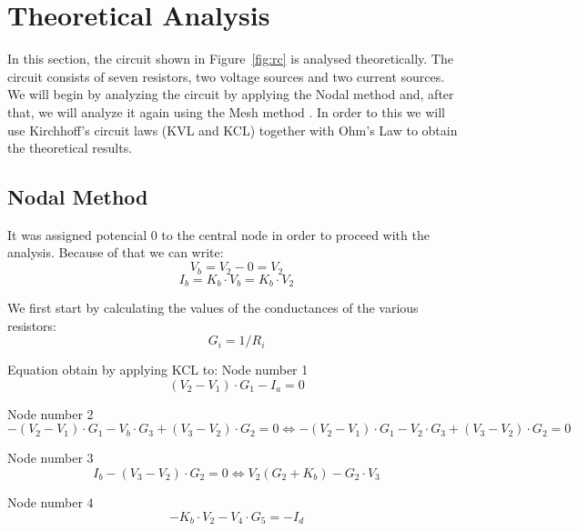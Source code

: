 \section{Theoretical Analysis}
\label{sec:analysis}

In this section, the circuit shown in Figure~\ref{fig:rc} is analysed
theoretically. The circuit consists of seven resistors, two voltage sources and two current sources. We will begin by analyzing the circuit by applying the Nodal method and, after that, we will analyze it again using the Mesh method . In order to this we will use Kirchhoff's circuit laws (KVL and KCL) together with Ohm's Law to obtain the theoretical results.
 
\subsection{Nodal Method}
It was assigned potencial 0 to the central node in order to proceed with the analysis. Because of that we can write:
\begin{equation}
  V_b=V_2 - 0 = V_2
\end{equation}
\begin{equation}
  I_b= K_b \cdot V_b= K_b \cdot V_2
\end{equation}

We first start by calculating the values of the conductances of the various resistors:
\begin{equation}
  G_i=1/R_i
\end{equation}

Equation obtain by applying KCL to:
Node number 1
\begin{equation}
  (V_2 - V_1)\cdot G_1 -I_a =0
  \label{eq:kcl}
\end{equation}

Node number 2
\begin{equation}
  -(V_2 -V_1)\cdot G_1 -V_b \cdot G_3 + (V_3-V_2)\cdot G_2 =0 
  \Leftrightarrow -(V_2 -V_1)\cdot G_1 -V_2 \cdot G_3 + (V_3-V_2)\cdot G_2 =0
  \label{eq:kcl2}
\end{equation}

Node number 3
\begin{equation}
  I_b - (V_3-V_2) \cdot G_2=0 \Leftrightarrow V_2(G_2 + K_b) - G_2 \cdot V_3
  \label{eq:kcl3}
\end{equation}

Node number 4
\begin{equation}
  -K_b\cdot V_2 - V_4 \cdot G_5 = - I_d
  \label{eq:kcl4}
\end{equation}

